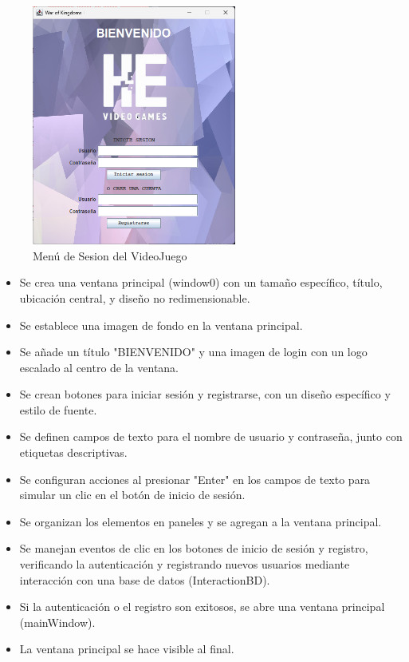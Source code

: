 \documentclass{article}
\begin{document}
	\begin{figure}[H]
        \centering
		\includegraphics[width=0.6\textwidth,keepaspectratio]{img/Menu_Sesion.png}
        \caption{Menú de Sesion del VideoJuego}
    \end{figure}

        \begin{itemize}	
		\item Se crea una ventana principal (window0) con un tamaño específico, título, ubicación central, y diseño no redimensionable.
            \item Se establece una imagen de fondo en la ventana principal.
            \item Se añade un título "BIENVENIDO" y una imagen de login con un logo escalado al centro de la ventana.
            \item Se crean botones para iniciar sesión y registrarse, con un diseño específico y estilo de fuente.
            \item Se definen campos de texto para el nombre de usuario y contraseña, junto con etiquetas descriptivas.
            \item Se configuran acciones al presionar "Enter" en los campos de texto para simular un clic en el botón de inicio de sesión.
            \item Se organizan los elementos en paneles y se agregan a la ventana principal.
            \item Se manejan eventos de clic en los botones de inicio de sesión y registro, verificando la autenticación y registrando nuevos usuarios mediante interacción con una base de datos (InteractionBD).
            \item Si la autenticación o el registro son exitosos, se abre una ventana principal (mainWindow).
            \item La ventana principal se hace visible al final.
	\end{itemize}
    
\end{document}
